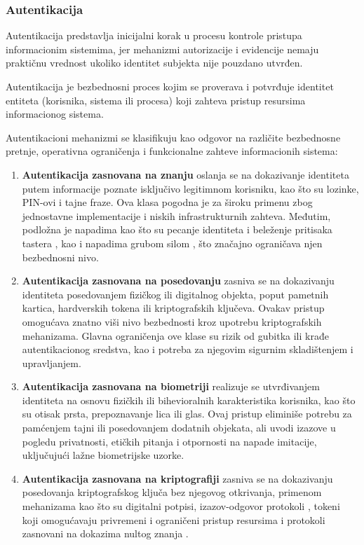 \subsubsection{Autentikacija}
Autentikacija predstavlja inicijalni korak u procesu kontrole pristupa informacionim sistemima, jer mehanizmi autorizacije i evidencije nemaju praktičnu vrednost ukoliko identitet subjekta nije pouzdano utvrđen.

\begin{definicija}
Autentikacija je bezbednosni proces kojim se proverava i potvrđuje identitet entiteta (korisnika, sistema ili procesa) koji zahteva pristup resursima informacionog sistema.
\end{definicija}

Autentikacioni mehanizmi se klasifikuju \cite{bonneau2012quest} kao odgovor na različite bezbednosne pretnje, operativna ograničenja i funkcionalne zahteve informacionih sistema:
\begin{enumerate}
\item \textbf{Autentikacija zasnovana na znanju } oslanja se na dokazivanje identiteta putem informacije poznate isključivo legitimnom korisniku, kao što su lozinke, PIN-ovi i tajne fraze. Ova klasa pogodna je za široku primenu zbog jednostavne implementacije i niskih infrastrukturnih zahteva. Međutim, podložna je napadima kao što su pecanje identiteta \cite{dhamija2006phishing}  i beleženje pritisaka tastera \cite{rai2022systematic} , kao i napadima grubom silom , što značajno ograničava njen bezbednosni nivo.
\item \textbf{Autentikacija zasnovana na posedovanju } zasniva se na dokazivanju identiteta posedovanjem fizičkog ili digitalnog objekta, poput pametnih kartica, hardverskih tokena ili kriptografskih ključeva. Ovakav pristup omogućava znatno viši nivo bezbednosti kroz upotrebu kriptografskih mehanizama. Glavna ograničenja ove klase su rizik od gubitka ili krađe autentikacionog sredstva, kao i potreba za njegovim sigurnim skladištenjem i upravljanjem.
\item \textbf{Autentikacija zasnovana na biometriji } realizuje se utvrđivanjem identiteta na osnovu fizičkih ili bihevioralnih karakteristika korisnika, kao što su otisak prsta, prepoznavanje lica ili glas. Ovaj pristup eliminiše potrebu za pamćenjem tajni ili posedovanjem dodatnih objekata, ali uvodi izazove u pogledu privatnosti, etičkih pitanja i otpornosti na napade imitacije, uključujući lažne biometrijske uzorke.
\item \textbf{Autentikacija zasnovana na kriptografiji } zasniva se na dokazivanju posedovanja kriptografskog ključa bez njegovog otkrivanja, primenom mehanizama kao što su digitalni potpisi, izazov-odgovor protokoli \cite{bellare1993entity}, tokeni koji omogućavaju privremeni i ograničeni pristup resursima \cite{hardt2012oauth}  i protokoli zasnovani na dokazima nultog znanja \cite{goldwasser2019knowledge} .
\end{enumerate}

